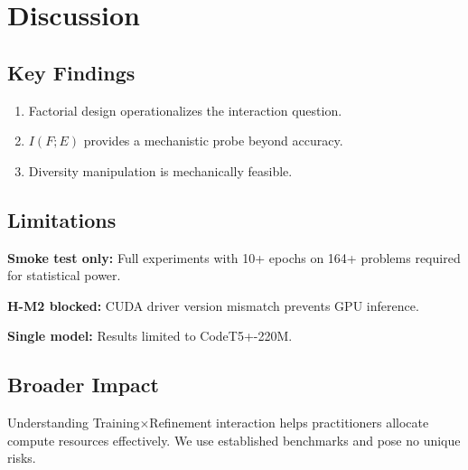\section{Discussion}
\label{sec:discussion}

\subsection{Key Findings}

\begin{enumerate}
    \item Factorial design operationalizes the interaction question.
    \item $I(F;E)$ provides a mechanistic probe beyond accuracy.
    \item Diversity manipulation is mechanically feasible.
\end{enumerate}

\subsection{Limitations}

\textbf{Smoke test only:} Full experiments with 10+ epochs on 164+ problems required for statistical power.

\textbf{H-M2 blocked:} CUDA driver version mismatch prevents GPU inference.

\textbf{Single model:} Results limited to CodeT5+-220M.

\subsection{Broader Impact}

Understanding Training$\times$Refinement interaction helps practitioners allocate compute resources effectively. We use established benchmarks and pose no unique risks.
